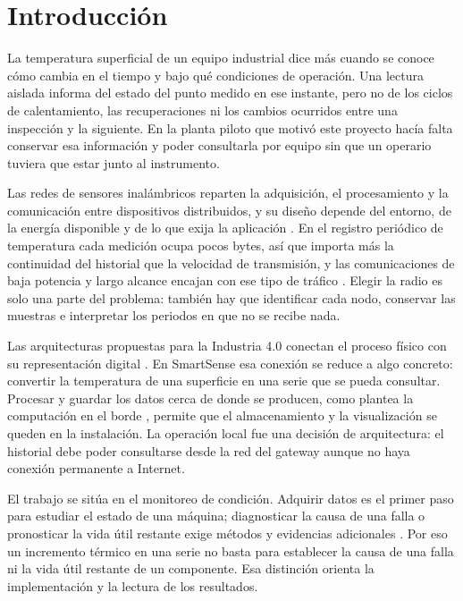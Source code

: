 \chapter{Introducción}
\label{cap:introduccion}

La temperatura superficial de un equipo industrial dice más cuando se conoce cómo cambia en el tiempo y bajo qué condiciones de operación. Una lectura aislada informa del estado del punto medido en ese instante, pero no de los ciclos de calentamiento, las recuperaciones ni los cambios ocurridos entre una inspección y la siguiente. En la planta piloto que motivó este proyecto hacía falta conservar esa información y poder consultarla por equipo sin que un operario tuviera que estar junto al instrumento.

Las redes de sensores inalámbricos reparten la adquisición, el procesamiento y la comunicación entre dispositivos distribuidos, y su diseño depende del entorno, de la energía disponible y de lo que exija la aplicación \citep{akyildiz2002,yick2008}. En el registro periódico de temperatura cada medición ocupa pocos bytes, así que importa más la continuidad del historial que la velocidad de transmisión, y las comunicaciones de baja potencia y largo alcance encajan con ese tipo de tráfico \citep{centenaro2016}. Elegir la radio es solo una parte del problema: también hay que identificar cada nodo, conservar las muestras e interpretar los periodos en que no se recibe nada.

Las arquitecturas propuestas para la Industria 4.0 conectan el proceso físico con su representación digital \citep{lee2015}. En SmartSense esa conexión se reduce a algo concreto: convertir la temperatura de una superficie en una serie que se pueda consultar. Procesar y guardar los datos cerca de donde se producen, como plantea la computación en el borde \citep{shi2016}, permite que el almacenamiento y la visualización se queden en la instalación. La operación local fue una decisión de arquitectura: el historial debe poder consultarse desde la red del gateway aunque no haya conexión permanente a Internet.

El trabajo se sitúa en el monitoreo de condición. Adquirir datos es el primer paso para estudiar el estado de una máquina; diagnosticar la causa de una falla o pronosticar la vida útil restante exige métodos y evidencias adicionales \citep{jardine2006}. Por eso un incremento térmico en una serie no basta para establecer la causa de una falla ni la vida útil restante de un componente. Esa distinción orienta la implementación y la lectura de los resultados.

